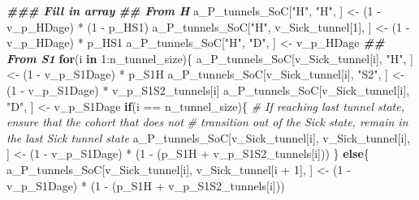 \documentclass[
]{article}
\newenvironment{Shaded}{\begin{snugshade}}{\end{snugshade}}
\newcommand{\CommentTok}[1]{\textcolor[rgb]{0.56,0.35,0.01}{\textit{#1}}}
\newcommand{\ControlFlowTok}[1]{\textcolor[rgb]{0.13,0.29,0.53}{\textbf{#1}}}
\newcommand{\DecValTok}[1]{\textcolor[rgb]{0.00,0.00,0.81}{#1}}
\newcommand{\DocumentationTok}[1]{\textcolor[rgb]{0.56,0.35,0.01}{\textbf{\textit{#1}}}}
\newcommand{\NormalTok}[1]{#1}
\newcommand{\OtherTok}[1]{\textcolor[rgb]{0.56,0.35,0.01}{#1}}
\newcommand{\SpecialCharTok}[1]{\textcolor[rgb]{0.00,0.00,0.00}{#1}}
\newcommand{\StringTok}[1]{\textcolor[rgb]{0.31,0.60,0.02}{#1}}
\begin{document}
\begin{Shaded}
\begin{Highlighting}[]
\DocumentationTok{\#\#\# Fill in array}
\DocumentationTok{\#\# From H}
\NormalTok{a\_P\_tunnels\_SoC[}\StringTok{"H"}\NormalTok{, }\StringTok{"H"}\NormalTok{, ]              }\OtherTok{\textless{}{-}}\NormalTok{ (}\DecValTok{1} \SpecialCharTok{{-}}\NormalTok{ v\_p\_HDage) }\SpecialCharTok{*}\NormalTok{ (}\DecValTok{1} \SpecialCharTok{{-}}\NormalTok{ p\_HS1)}
\NormalTok{a\_P\_tunnels\_SoC[}\StringTok{"H"}\NormalTok{, v\_Sick\_tunnel[}\DecValTok{1}\NormalTok{], ] }\OtherTok{\textless{}{-}}\NormalTok{ (}\DecValTok{1} \SpecialCharTok{{-}}\NormalTok{ v\_p\_HDage) }\SpecialCharTok{*}\NormalTok{ p\_HS1}
\NormalTok{a\_P\_tunnels\_SoC[}\StringTok{"H"}\NormalTok{, }\StringTok{"D"}\NormalTok{, ]              }\OtherTok{\textless{}{-}}\NormalTok{ v\_p\_HDage}
\DocumentationTok{\#\# From S1}
\ControlFlowTok{for}\NormalTok{(i }\ControlFlowTok{in} \DecValTok{1}\SpecialCharTok{:}\NormalTok{n\_tunnel\_size)\{}
\NormalTok{  a\_P\_tunnels\_SoC[v\_Sick\_tunnel[i], }\StringTok{"H"}\NormalTok{, ]  }\OtherTok{\textless{}{-}}\NormalTok{ (}\DecValTok{1} \SpecialCharTok{{-}}\NormalTok{ v\_p\_S1Dage) }\SpecialCharTok{*}\NormalTok{ p\_S1H}
\NormalTok{  a\_P\_tunnels\_SoC[v\_Sick\_tunnel[i], }\StringTok{"S2"}\NormalTok{, ] }\OtherTok{\textless{}{-}}\NormalTok{ (}\DecValTok{1} \SpecialCharTok{{-}}\NormalTok{ v\_p\_S1Dage) }\SpecialCharTok{*}\NormalTok{ v\_p\_S1S2\_tunnels[i]}
\NormalTok{  a\_P\_tunnels\_SoC[v\_Sick\_tunnel[i], }\StringTok{"D"}\NormalTok{, ]  }\OtherTok{\textless{}{-}}\NormalTok{ v\_p\_S1Dage}
  \ControlFlowTok{if}\NormalTok{(i }\SpecialCharTok{==}\NormalTok{ n\_tunnel\_size)\{}
    \CommentTok{\# If reaching last tunnel state, ensure that the cohort that does not}
    \CommentTok{\# transition out of the Sick state, remain in the last Sick tunnel state}
\NormalTok{    a\_P\_tunnels\_SoC[v\_Sick\_tunnel[i],}
\NormalTok{                    v\_Sick\_tunnel[i], ] }\OtherTok{\textless{}{-}}\NormalTok{ (}\DecValTok{1} \SpecialCharTok{{-}}\NormalTok{ v\_p\_S1Dage) }\SpecialCharTok{*}
\NormalTok{      (}\DecValTok{1} \SpecialCharTok{{-}}\NormalTok{ (p\_S1H }\SpecialCharTok{+}\NormalTok{ v\_p\_S1S2\_tunnels[i]))}
\NormalTok{  \} }\ControlFlowTok{else}\NormalTok{\{}
\NormalTok{    a\_P\_tunnels\_SoC[v\_Sick\_tunnel[i], }
\NormalTok{                    v\_Sick\_tunnel[i }\SpecialCharTok{+} \DecValTok{1}\NormalTok{], ]   }\OtherTok{\textless{}{-}}\NormalTok{ (}\DecValTok{1} \SpecialCharTok{{-}}\NormalTok{ v\_p\_S1Dage) }\SpecialCharTok{*}
\NormalTok{      (}\DecValTok{1} \SpecialCharTok{{-}}\NormalTok{ (p\_S1H }\SpecialCharTok{+}\NormalTok{ v\_p\_S1S2\_tunnels[i]))}

\end{Highlighting}
\end{Shaded}
\end{document}
